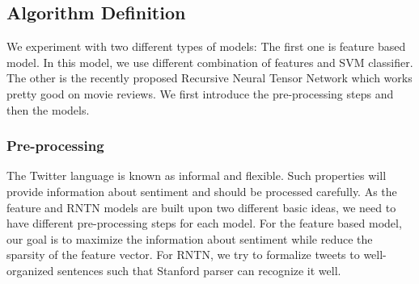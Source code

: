 \subsection{Algorithm Definition}
We experiment with two different types of models: The first one is feature based model. 
In this model, we use different combination of features and SVM 
classifier. 
 The other is the recently proposed Recursive Neural Tensor Network which works pretty good on movie reviews. We first introduce the pre-processing steps and then the models. 

\subsubsection{Pre-processing}
The Twitter language is known as informal and flexible. Such properties will provide information about sentiment and should be processed carefully. As the feature and RNTN models are built upon two different basic ideas, we need to have different pre-processing steps for each model. For the feature based model, our goal is to maximize the information about sentiment while reduce the sparsity of the feature vector. For RNTN, we try to formalize tweets to well-organized sentences such that Stanford parser can recognize it well.

